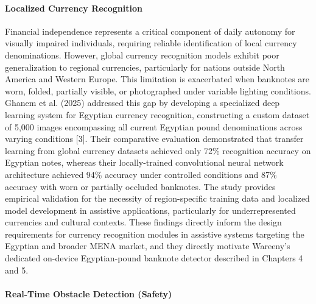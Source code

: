 \documentclass[12pt,a4paper]{report}
\begin{document}
\paragraph*{Localized Currency Recognition}

Financial independence represents a critical component of daily autonomy for visually impaired individuals, requiring reliable identification of local currency denominations. However, global currency recognition models exhibit poor generalization to regional currencies, particularly for nations outside North America and Western Europe. This limitation is exacerbated when banknotes are worn, folded, partially visible, or photographed under variable lighting conditions. Ghanem et al. (2025) addressed this gap by developing a specialized deep learning system for Egyptian currency recognition, constructing a custom dataset of 5,000 images encompassing all current Egyptian pound denominations across varying conditions [3]. Their comparative evaluation demonstrated that transfer learning from global currency datasets achieved only 72\% recognition accuracy on Egyptian notes, whereas their locally-trained convolutional neural network architecture achieved 94\% accuracy under controlled conditions and 87\% accuracy with worn or partially occluded banknotes. The study provides empirical validation for the necessity of region-specific training data and localized model development in assistive applications, particularly for underrepresented currencies and cultural contexts. These findings directly inform the design requirements for currency recognition modules in assistive systems targeting the Egyptian and broader MENA market, and they directly motivate Wareeny's dedicated on-device Egyptian-pound banknote detector described in Chapters 4 and 5.

\paragraph*{Real-Time Obstacle Detection (Safety)}
\end{document}
